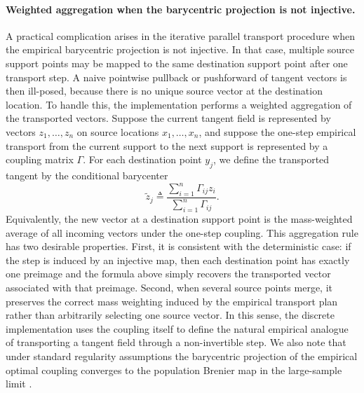 \documentclass[11pt]{article}
\begin{document}
\paragraph{Weighted aggregation when the barycentric projection is not injective.}
A practical complication arises in the iterative parallel transport procedure when the empirical
barycentric projection is not injective. In that case, multiple source support points may be mapped
to the same destination support point after one transport step. A naive pointwise pullback or
pushforward of tangent vectors is then ill-posed, because there is no unique source vector at
the destination location. To handle this, the implementation performs a weighted aggregation of the transported vectors. Suppose the current tangent field is represented by vectors \(z_1,\dots,z_n\) on source locations
\(x_1,\dots,x_n\), and suppose the one-step empirical transport from the current support to the next
support is represented by a coupling matrix \(\Gamma\). For each destination point \(y_j\), we define
the transported tangent by the conditional barycenter
\[
\tilde z_j
\triangleq
\frac{\sum_{i=1}^n \Gamma_{ij} z_i}{\sum_{i=1}^n \Gamma_{ij}}.
\]
Equivalently, the new vector at a destination support point is the mass-weighted average of all
incoming vectors under the one-step coupling. This aggregation rule has two desirable properties. First, it is consistent with the deterministic
case: if the step is induced by an injective map, then each destination point has exactly one
preimage and the formula above simply recovers the transported vector associated with that
preimage. Second, when several source points merge, it preserves the correct mass weighting induced
by the empirical transport plan rather than arbitrarily selecting one source vector. In this
sense, the discrete implementation uses the coupling itself to define the natural empirical analogue
of transporting a tangent field through a non-invertible step. We also note that under standard regularity assumptions the barycentric projection of the empirical optimal coupling converges to the population Brenier map in the large-sample limit \citep[Theorem 2.2 and Corollary 2.3]{deb2021rates}.
\end{document}
